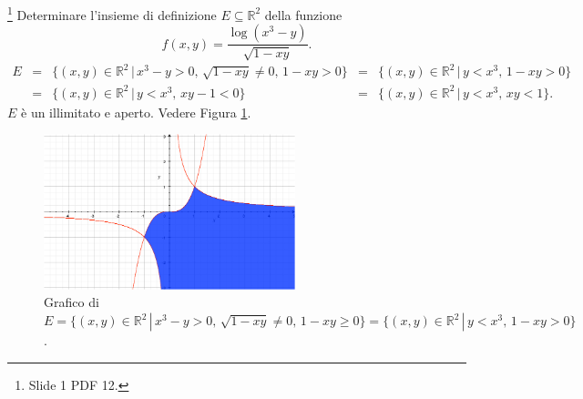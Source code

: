 \begin{exercise}\footnote{Slide 1 PDF 12.}
    Determinare l'insieme di definizione $E\subseteq\mathbb R^2$ della funzione
    \begin{equation*}
        f(x,y)=\frac{\log(x^3-y)}{\sqrt{1-xy}}.
    \end{equation*}
    \begin{equation*}
        \begin{matrix}
            E &=& \{(x,y)\in\mathbb R^2\,|\, x^3-y>0,\,\sqrt{1-xy}\neq 0,\, 1-xy> 0\} &=& \{(x,y)\in\mathbb R^2\,|\, y<x^3,\, 1-xy>0\}\\
            &=& \{(x,y)\in\mathbb R^2\,|\, y<x^3,\, xy-1<0\} &=&\{(x,y)\in\mathbb R^2\,|\, y<x^3,\, xy<1\}.
        \end{matrix}
    \end{equation*}
    $E$ è un illimitato e aperto.
    Vedere Figura \ref{fig:esempio_dominio_analisi2_1}.
    \begin{figure}
    \centering
    \includegraphics[width=0.65\textwidth]{Analisi2/figures/esempio_dominio_analisi2_1.jpg}
        \caption{Grafico di $E=\{(x,y)\in\mathbb R^2\,|\, x^3-y>0,\,\sqrt{1-xy}\neq 0,\, 1-xy\geq 0\}=\{(x,y)\in\mathbb R^2\,|\, y<x^3,\, 1-xy>0\}$.}\label{fig:esempio_dominio_analisi2_1}
    \end{figure}
\end{exercise}

